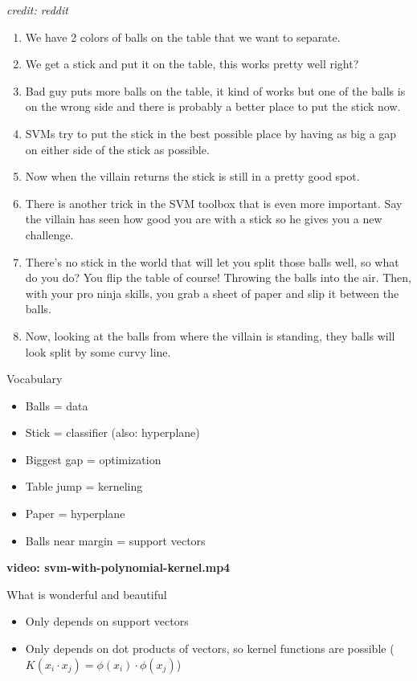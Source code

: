 




 \hspace{2mm} \textit{credit: reddit}
\begin{enumerate}
\item We have 2 colors of balls on the table that we want to separate.
\item We get a stick and put it on the table, this works pretty well right?
\item Bad guy puts more balls on the table, it kind of works but one
  of the balls is on the wrong side and there is probably a better
  place to put the stick now.
\item SVMs try to put the stick in the best possible place by having
  as big a gap on either side of the stick as possible.
\item Now when the villain returns the stick is still in a pretty
  good spot.
\item There is another trick in the SVM toolbox that is even more
  important. Say the villain has seen how good you are with a stick
  so he gives you a new challenge.
\item There’s no stick in the world that will let you split those
  balls well, so what do you do? You flip the table of course!
  Throwing the balls into the air. Then, with your pro ninja skills,
  you grab a sheet of paper and slip it between the balls.
\item Now, looking at the balls from where the villain is standing,
  they balls will look split by some curvy line.
\end{enumerate}

Vocabulary
\begin{itemize}
\item Balls = data
\item Stick = classifier (also: hyperplane)
\item Biggest gap = optimization
\item Table jump = kerneling
\item Paper = hyperplane\\[2mm]
\item Balls near margin = support vectors
\end{itemize}

\textbf{video: svm-with-polynomial-kernel.mp4}

What is wonderful and beautiful
\begin{itemize}
\item Only depends on support vectors
\item Only depends on dot products of vectors, so kernel functions are
  possible ($K(x_i\cdot x_j) = \phi(x_i)\cdot \phi(x_j)$)
\end{itemize}


